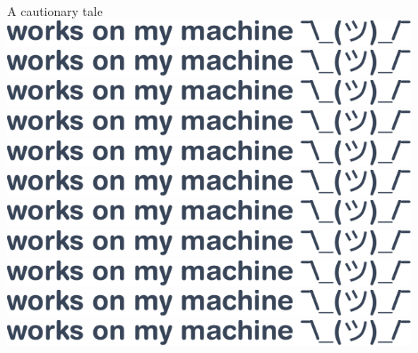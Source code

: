 \documentclass[t, aspectratio=169]{beamer}
\begin{document}
\begin{frame}{A cautionary tale}
     {
    }
     {
        \includegraphics[width=0.9\textwidth]{img/works-on-my-machine.pdf}
    }
     {
        \includegraphics[width=0.9\textwidth]{img/works-on-my-machine.pdf}
    }
     {
        \includegraphics[width=0.9\textwidth]{img/works-on-my-machine.pdf}
    }
     {
        \includegraphics[width=0.9\textwidth]{img/works-on-my-machine.pdf}
    }
     {
        \includegraphics[width=0.9\textwidth]{img/works-on-my-machine.pdf}
    }
     {
        \includegraphics[width=0.9\textwidth]{img/works-on-my-machine.pdf}
    }
     {
        \includegraphics[width=0.9\textwidth]{img/works-on-my-machine.pdf}
    }
     {
        \includegraphics[width=0.9\textwidth]{img/works-on-my-machine.pdf}
    }
     {
        \includegraphics[width=0.9\textwidth]{img/works-on-my-machine.pdf}
    }
     {
        \includegraphics[width=0.9\textwidth]{img/works-on-my-machine.pdf}
    }
     {
        \includegraphics[width=0.9\textwidth]{img/works-on-my-machine.pdf}
    }
\end{frame}
\end{document}

